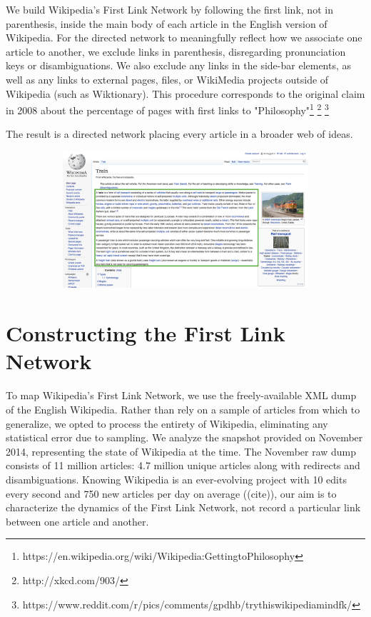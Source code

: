 \documentclass[twoside]{article}
\begin{document}
We build Wikipedia's First Link Network by following the first link, not in parenthesis, inside the main body of each article in the English version of Wikipedia. 
For the directed network to meaningfully reflect how we associate one article to another, we exclude links in parenthesis, 
disregarding pronunciation keys or disambiguations.
We also exclude any links in the side-bar elements, as well as any links to external pages, files, or WikiMedia 
projects outside of Wikipedia (such as Wiktionary).
This procedure corresponds to the original claim in 2008 about the percentage of pages with first links to 
"Philosophy"\footnote{
https://en.wikipedia.org/wiki/Wikipedia:GettingtoPhilosophy
}
\footnote{
http://xkcd.com/903/
}
\footnote{
https://www.reddit.com/r/pics/comments/gpdhb/trythiswikipediamindfk/
}

The result is a directed network placing every article in a broader web of ideas.


\begin{figure}[H]
\centering
\caption{Wikipedia Train}
    \begin{subfigure}[b]{0.8\textwidth}
        \includegraphics[width=\textwidth]{graphics/wiki_train.png}    
    \end{subfigure}
\end{figure}
\section{Constructing the First Link Network}

To map Wikipedia's First Link Network, we use the freely-available XML dump of the English Wikipedia. 
Rather than rely on a sample of articles from which to generalize, we opted to process the entirety of Wikipedia, 
eliminating any statistical error due to sampling.
We analyze the snapshot provided on November 2014, representing the state of Wikipedia at the time.
The November raw dump consists of 11 million articles: 4.7 million unique articles along with redirects
and disambiguations.
Knowing Wikipedia is an ever-evolving project with 10 edits every second and 750 new articles per day on average
((cite)), our aim is to characterize the dynamics of the First Link Network, not record a particular link between one
article and another.
\end{document}
